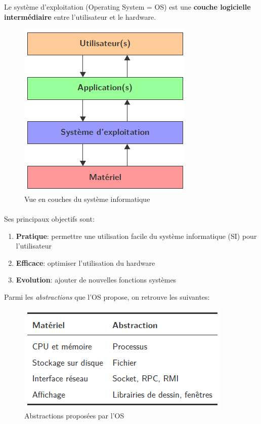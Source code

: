 \item{}
{
Le système d'exploitation (Operating System = OS) est une \textbf{couche logicielle intermédiaire} entre l'utilisateur et le hardware.
\begin{figure}[h!]
\center\includegraphics[scale=.4]{images/couches-si}
\caption{Vue en couches du système informatique \cite{ref1}}
\end{figure}
\paragraph{}
Ses principaux objectifs sont:
\begin{enumerate}
\item \textbf{Pratique}: permettre une utilisation facile du système informatique (SI) pour l'utilisateur
\item \textbf{Efficace}: optimiser l'utilisation du hardware
\item \textbf{Evolution}: ajouter de nouvelles fonctions systèmes
\end{enumerate}

Parmi les \textit{abstractions} que l'OS propose, on retrouve les suivantes:
\begin{figure}[h!]
\center\includegraphics[scale=.5]{images/abstractions-OS}
\caption{Abstractions proposées par l'OS \cite{ref1}}
\end{figure}

}
